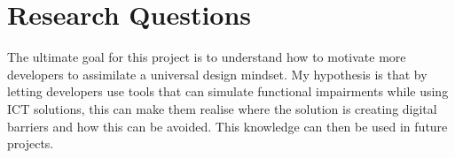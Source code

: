 
\section{Research Questions}

The ultimate goal for this project is to understand how to motivate more developers to assimilate a universal design mindset. My hypothesis is that by letting developers use tools that can simulate functional impairments while using ICT solutions, this can make them realise where the solution is creating digital barriers and how this can be avoided. This knowledge can then be used in future projects.



